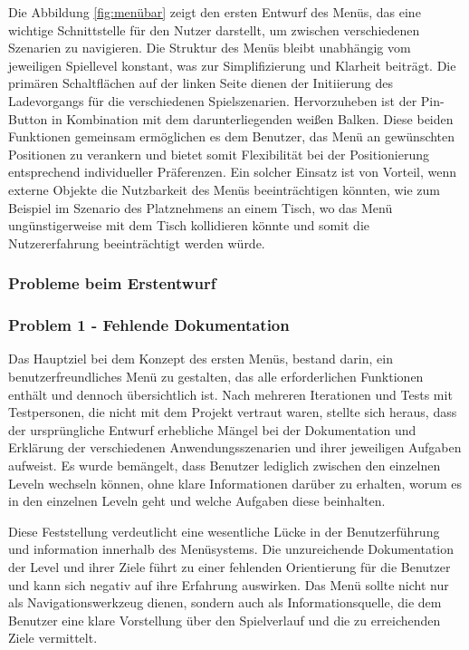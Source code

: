Die Abbildung \ref{fig:menübar} zeigt den ersten Entwurf des Menüs, das eine wichtige Schnittstelle für den Nutzer darstellt, um zwischen verschiedenen Szenarien zu navigieren. Die Struktur des Menüs bleibt unabhängig vom jeweiligen Spiellevel konstant, was zur Simplifizierung und Klarheit beiträgt. Die primären Schaltflächen auf der linken Seite dienen der Initiierung des Ladevorgangs für die verschiedenen Spielszenarien. Hervorzuheben ist der Pin-Button in Kombination mit dem darunterliegenden weißen Balken. Diese beiden Funktionen gemeinsam ermöglichen es dem Benutzer, das Menü an gewünschten Positionen zu verankern und bietet somit Flexibilität bei der Positionierung entsprechend individueller Präferenzen. Ein solcher Einsatz ist von Vorteil, wenn externe Objekte die Nutzbarkeit des Menüs beeinträchtigen könnten, wie zum Beispiel im Szenario des Platznehmens an einem Tisch, wo das Menü ungünstigerweise mit dem Tisch kollidieren könnte und somit die Nutzererfahrung beeinträchtigt werden würde.

\subsubsection{Probleme beim Erstentwurf}
\subsubsection*{Problem 1 - Fehlende Dokumentation}
Das Hauptziel bei dem Konzept des ersten Menüs, bestand darin, ein benutzerfreundliches Menü zu gestalten, das alle erforderlichen Funktionen enthält und dennoch übersichtlich ist. Nach mehreren Iterationen und Tests mit Testpersonen, die nicht mit dem Projekt vertraut waren, stellte sich heraus, dass der ursprüngliche Entwurf erhebliche Mängel bei der Dokumentation und Erklärung der verschiedenen Anwendungsszenarien und ihrer jeweiligen Aufgaben aufweist. Es wurde bemängelt, dass Benutzer lediglich zwischen den einzelnen Leveln wechseln können, ohne klare Informationen darüber zu erhalten, worum es in den einzelnen Leveln geht und welche Aufgaben diese beinhalten.

Diese Feststellung verdeutlicht eine wesentliche Lücke in der Benutzerführung und information innerhalb des Menüsystems. Die unzureichende Dokumentation der Level und ihrer Ziele führt zu einer fehlenden Orientierung für die Benutzer und kann sich negativ auf ihre Erfahrung auswirken. Das Menü sollte nicht nur als Navigationswerkzeug dienen, sondern auch als Informationsquelle, die dem Benutzer eine klare Vorstellung über den Spielverlauf und die zu erreichenden Ziele vermittelt.

